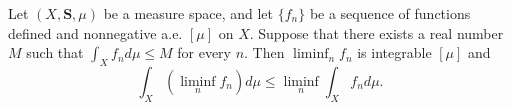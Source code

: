 Let $(X, \mathbf{S}, \mu)$ be a measure space, and let $\{f_n\}$ be a sequence of functions defined and nonnegative a.e. $[\mu]$ on $X$. Suppose that there exists a real number $M$ such that $\int_X f_n d\mu \leq M$ for every $n$. Then $\liminf_n f_n$ is integrable $[\mu]$ and
$$\int_X (\liminf_n f_n) d\mu \leq \liminf_n \int_X f_n d\mu.$$

